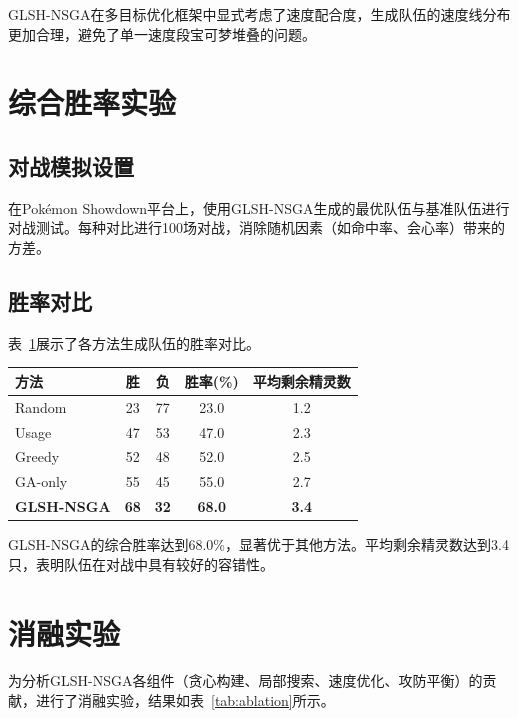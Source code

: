 GLSH-NSGA在多目标优化框架中显式考虑了速度配合度，生成队伍的速度线分布更加合理，避免了单一速度段宝可梦堆叠的问题。

\section{综合胜率实验}

\subsection{对战模拟设置}

在Pokémon Showdown平台上，使用GLSH-NSGA生成的最优队伍与基准队伍进行对战测试。每种对比进行100场对战，消除随机因素（如命中率、会心率）带来的方差。

\subsection{胜率对比}

表~\ref{tab:winrate}展示了各方法生成队伍的胜率对比。

\begin{table}[!htbp]
    \label{tab:winrate}
    \centering
    \footnotesize
    \begin{tabular}{lcccc}
        \hline
        方法 & 胜 & 负 & 胜率(\%) & 平均剩余精灵数 \\
        \hline
        Random & 23 & 77 & 23.0 & 1.2 \\
        Usage & 47 & 53 & 47.0 & 2.3 \\
        Greedy & 52 & 48 & 52.0 & 2.5 \\
        GA-only & 55 & 45 & 55.0 & 2.7 \\
        \textbf{GLSH-NSGA} & \textbf{68} & \textbf{32} & \textbf{68.0} & \textbf{3.4} \\
        \hline
    \end{tabular}
\end{table}

GLSH-NSGA的综合胜率达到68.0\%，显著优于其他方法。平均剩余精灵数达到3.4只，表明队伍在对战中具有较好的容错性。

\section{消融实验}

为分析GLSH-NSGA各组件（贪心构建、局部搜索、速度优化、攻防平衡）的贡献，进行了消融实验，结果如表~\ref{tab:ablation}所示。

